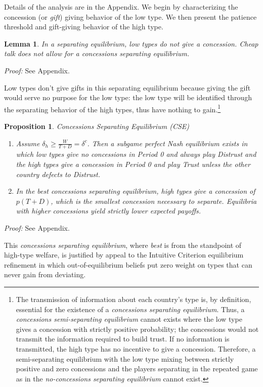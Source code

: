 \documentclass[bibtex,autowc]{apsr_submission}
\newcommand{\de}{\delta}
\newtheorem{proposition}{Proposition}
\newtheorem{lemma}{Lemma}
\begin{document}
Details of the analysis are in the Appendix. We begin by characterizing the concession (or \emph{gift}) giving behavior of the low type. We then present the patience threshold and gift-giving behavior of the high type.

\begin{lemma}
	In a separating equilibrium, low types do not give a concession. Cheap talk does not allow for a \emph{concessions separating equilibrium}.
	\label{lemma:3}
\end{lemma}
\emph{Proof:} See Appendix.

Low types don't give gifts in this separating equilibrium because giving the gift would serve no purpose for the low type: the low type will be identified through the separating behavior of the high types, thus have nothing to gain.\footnote{The transmission of information about each country's type is, by definition, essential for the existence of a \emph{concessions separating equilibrium}. Thus, a \emph{concessions semi-separating equilibrium} cannot exists where the low type gives a concession with strictly positive probability; the concessions would not transmit the information required to build trust. If no information is transmitted, the high type has no incentive to give a concession. Therefore, a semi-separating equilibrium with the low type mixing between strictly positive and zero concessions and the players separating in the repeated game as in the \emph{no-concessions separating equilibrium} cannot exist.}

\begin{proposition}
\emph{Concessions Separating Equilibrium (CSE)}
	\begin{enumerate}
		\item[(a)] Assume $\delta_h \geq \frac{W}{T+D} = \de^{c}$. Then a subgame perfect Nash equilibrium exists in which low types give no concessions in Period 0 and always play Distrust and the high types give a concession in Period 0 and play Trust unless the other country defects to Distrust.
		\item[(b)] In the best \emph{concessions separating equilibrium}, high types give a concession of $p(T + D)$, which is the smallest concession necessary to separate. Equilibria with higher concessions yield strictly lower expected payoffs.
\end{enumerate}
	\label{proposition:2}
\end{proposition}
\emph{Proof:} See Appendix.

This  \emph{concessions separating equilibrium}, where \emph{best} is from the standpoint of high-type welfare, is justified by appeal to the Intuitive Criterion equilibrium refinement in which out-of-equilibrium beliefs put zero weight on types that can never gain from deviating.
\end{document}
